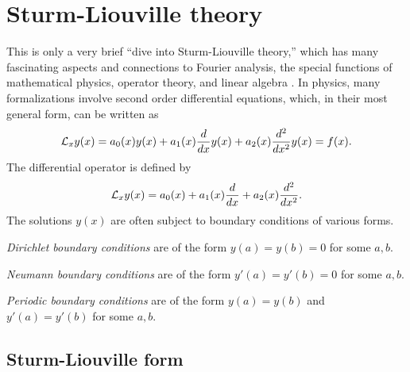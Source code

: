 \chapter{Sturm-Liouville theory}
\label{2011-m-ch-sl}

This is only a very brief ``dive into Sturm-Liouville theory,''
which has many fascinating aspects and connections to Fourier analysis, the
special functions of mathematical physics, operator theory, and linear algebra
\cite{birkhoff-Rota-48,Al-Gwaiz,everitt-handbook-sl}.
In physics, many formalizations involve second order differential equations,
which, in their most general form, can be written as \cite{herman-sc}
\begin{equation}
{\cal L}_x y(x) =
a_0(x) y(x)  +
a_1(x) \frac{d}{dx}y(x)+
a_2(x) \frac{d^2}{dx^2}y(x) =
f(x).
\label{2011-m-ch-sl1}
\end{equation}
The differential operator is defined by
\begin{equation}
{\cal L}_x y(x) = a_0(x)
+
a_1(x) \frac{d}{dx}+
a_2(x) \frac{d^2}{dx^2}.
\label{2011-m-ch-sl1do}
\end{equation}
The solutions $y(x)$ are often subject to boundary conditions of various forms.

{\em Dirichlet boundary conditions}
are of the form $y(a)=y(b)=0$ for some $a,b$.


{\em Neumann boundary conditions}
are of the form $y'(a)=y'(b)=0$ for some $a,b$.

{\em Periodic boundary conditions}
are of the form $y(a)=y(b)$ and $y'(a)=y'(b)$ for some $a,b$.

\section{Sturm-Liouville form}

